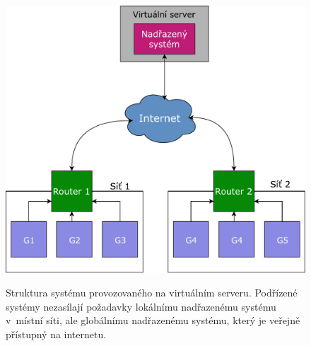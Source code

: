 \begin{figure}[h!]
    \centering
    \includegraphics[width=\textwidth]{images/aws.pdf}
    \label{fig:aws}
    \caption[Struktura systému provozovaného na virtuálním serveru]{Struktura systému provozovaného na virtuálním serveru. Podřízené systémy nezasílají požadavky lokálnímu nadřazenému systému v~místní síti, ale globálnímu nadřazenému systému, který je veřejně přístupný na internetu.}
\end{figure}
